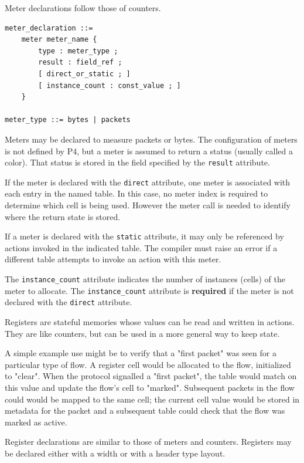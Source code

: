 \documentclass[12pt]{article}
\begin{document}

Meter declarations follow those of counters.

\begin{lstlisting}[style=BNFstyle]
meter_declaration ::= 
    meter meter_name {
        type : meter_type ;
        result : field_ref ;
        [ direct_or_static ; ]
        [ instance_count : const_value ; ]
    }

meter_type ::= bytes | packets
\end{lstlisting}

Meters may be declared to measure packets or bytes. The configuration
of meters is not defined by P4, but a meter is assumed to return a
status (usually called a color). That status is stored in the field
specified by the \texttt{result} attribute.

If the meter is declared with the \texttt{direct} attribute, one meter
is associated with each entry in the named table. In this case, no
meter index is required to determine which cell is being used. However
the meter call is needed to identify where the return state is stored.

If a meter is declared with the \texttt{static} attribute, it may only
be referenced by actions invoked in the indicated table. The compiler
must raise an error if a different table attempts to invoke an action
with this meter.

The \texttt{instance_count} attribute indicates the number of
instances (cells) of the meter to allocate.  The
\texttt{instance_count} attribute is \textbf{required} if the meter
is not declared with the \texttt{direct} attribute.


Registers are stateful memories whose values can be read and written
in actions.  They are like counters, but can be used in a more general
way to keep state.

A simple example use might be to verify that a "first packet" was seen
for a particular type of flow. A register cell would be allocated to
the flow, initialized to "clear". When the protocol signalled a "first
packet", the table would match on this value and update the flow's
cell to "marked".  Subsequent packets in the flow could would be
mapped to the same cell; the current cell value would be stored in
metadata for the packet and a subsequent table could check that the
flow was marked as active.

Register declarations are similar to those of meters and
counters. Registers may be declared either with a width or with a
header type layout.
\end{document}
